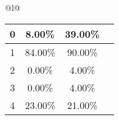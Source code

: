 \begin{longtable}{@{}l@{}}
\begin{minipage}{\textwidth}
\begin{tabular}{|c|c|c|c|}
0 & 8.00\% & 39.00\% & \textcolor{green}{\ding{51}} \\ \hline
1 & 84.00\% & 90.00\% & \textcolor{green}{\ding{51}} \\ \hline
2 & 0.00\% & 4.00\% & \textcolor{green}{\ding{51}} \\ \hline
3 & 0.00\% & 4.00\% & \textcolor{green}{\ding{51}} \\ \hline
4 & 23.00\% & 21.00\% & \textcolor{red}{\ding{55}} \\ \hline
\end{tabular}
\end{minipage}\\[2ex]
\end{longtable}